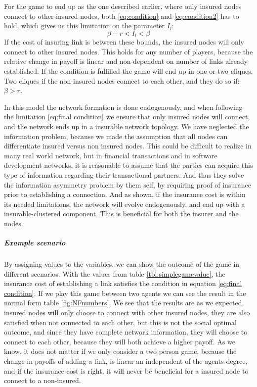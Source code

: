 For the game to end up as the one described earlier, where only insured nodes connect to other insured nodes, both \ref{eq:condition} and \ref{eq:condition2} has to hold, which gives us this limitation on the parameter $I_{l}$:
\begin{equation}
\beta-r<I_{l}<\beta
\label{eq:final condition}
\end{equation}
If the cost of insuring link is between these bounds, the insured nodes will only connect to other insured nodes. This holds for any number of players, because the relative change in payoff is linear and non-dependent on number of links already established. 
If the condition is fulfilled the game will end up in one or two cliques. Two cliques if the non-insured nodes connect to each other, and they do so if: $\beta>r$. 

In this model the network formation is done endogenously, and when following the limitation \ref{eq:final condition} we ensure that only insured nodes will connect, and the network ends up in a insurable network topology. 
We have neglected the information problem, because we made the assumption that all nodes can differentiate insured versus non insured nodes. This could be difficult to realize in many real world network, but in financial transactions and in software development networks, it is reasonable to assume that the parties can acquire this type of information regarding their transactional partners. And thus they solve the information asymmetry problem by them self, by requiring proof of insurance prior to establishing a connection. 
And as shown, if the insurance cost is within its needed limitations, the network will evolve endogenously, and end up with a insurable-clustered component. This is beneficial for both the insurer and the nodes.

\subparagraph{Example scenario}
By assigning values to the variables, we can show the outcome of the game in different scenarios. With the values from table \ref{tbl:simplegamevalue}, the insurance cost of establishing a link satisfies the condition in equation \ref{eq:final condition}.
If we play this game between two agents we can see the result in the normal form table \ref{fig:NFnumbers}. 
We see that the results are as we expected, insured nodes will only choose to connect with other insured nodes, they are also satisfied when not connected to each other, but this is not the social optimal outcome, and since they have complete network information, they will choose to connect to each other, because they will both achieve a higher payoff.
As we know, it does not matter if we only consider a two person game, because the change in payoffs of adding a link, is linear an independent of the agents degree, and if the insurance cost is right, it will never be beneficial for a insured node to connect to a non-insured. 

